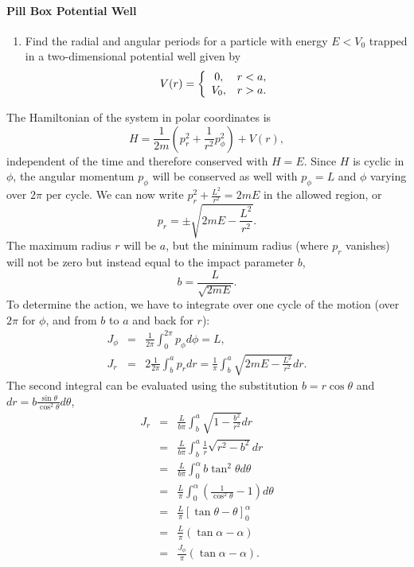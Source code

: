 \documentclass[letterpaper,11pt]{article}
\begin{document}
\paragraph*{Pill Box Potential Well}
\begin{enumerate}[resume]
 \item Find the radial and angular periods for a particle with energy $E < V_0$ trapped in a two-dimensional potential well given by
 \begin{equation*}
  V(r) = \left\{
  \begin{array}{c l}
   0, & r < a, \\
   V_0, & r > a.
  \end{array}
  \right.
 \end{equation*}
\end{enumerate}
The Hamiltonian of the system in polar coordinates is
\begin{equation*}
 H = \frac{1}{2m} (p_r^2 + \frac{1}{r^2} p_\phi^2) + V(r),
\end{equation*}
independent of the time and therefore conserved with $H = E$.  Since $H$ is cyclic in $\phi$, the angular momentum $p_\phi$ will be conserved as well with $p_\phi = L$ and $\phi$ varying over $2\pi$ per cycle.  We can now write $p_r^2 + \frac{L^2}{r^2} = 2 m E$ in the allowed region, or
\begin{equation*}
 p_r = \pm \sqrt{2 m E - \frac{L^2}{r^2}}.
\end{equation*}
The maximum radius $r$ will be $a$, but the minimum radius (where $p_r$ vanishes) will not be zero but instead equal to the impact parameter $b$,
\begin{equation*}
 b = \frac{L}{\sqrt{2mE}}.
\end{equation*}
To determine the action, we have to integrate over one cycle of the motion (over $2\pi$ for $\phi$, and from $b$ to $a$ and back for $r$):
\begin{eqnarray*}
 J_\phi & = & \frac{1}{2\pi} \int_0^{2\pi} p_\phi d\phi = L, \\
 J_r    & = & 2 \frac{1}{2\pi} \int_b^a p_r dr = \frac{1}{\pi} \int_b^a \sqrt{2 m E - \frac{L^2}{r^2}} dr.
\end{eqnarray*}
The second integral can be evaluated using the substitution $b = r \cos\theta$ and $dr = b \frac{\sin\theta}{\cos^2\theta} d\theta$,
\begin{eqnarray*}
 J_r & = & \frac{L}{b\pi} \int_b^a \sqrt{1 - \frac{b^2}{r^2}} dr \\
     & = & \frac{L}{b\pi} \int_b^a \frac{1}{r} \sqrt{r^2 - b^2} dr \\
     & = & \frac{L}{b\pi} \int_0^\alpha b \tan^2\theta d\theta \\
     & = & \frac{L}{\pi} \int_0^\alpha \left(\frac{1}{\cos^2\theta} - 1\right) d\theta \\
     & = & \frac{L}{\pi} \left[ \tan\theta - \theta \right]_0^\alpha \\
     & = & \frac{L}{\pi} \left( \tan\alpha - \alpha \right) \\
     & = & \frac{J_\phi}{\pi} \left( \tan\alpha - \alpha \right).
\end{eqnarray*}
\end{document}
